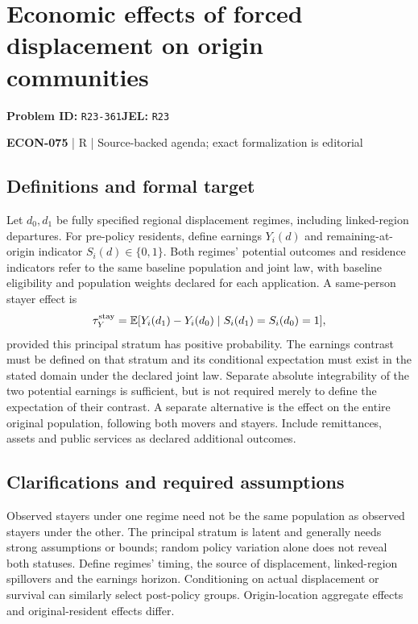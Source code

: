 \documentclass[11pt,a4paper]{article}
\begin{document}
\section*{Economic effects of forced displacement on origin communities}
\textbf{Problem ID:} \texttt{R23-361}\quad \textbf{JEL:} \texttt{R23}\par
\label{problem:OP-0641}


\label{audited:ECON-075}

{\sffamily\small\color{muted}\textbf{ECON-075} | R | Source-backed agenda; exact formalization is editorial\par}

\subsection*{Definitions and formal target}

Let \(d_0,d_1\) be fully specified regional displacement regimes, including linked-region departures. For pre-policy residents, define earnings \(Y_i(d)\) and remaining-at-origin indicator \(S_i(d)\in\{0,1\}\). Both regimes' potential outcomes and residence indicators refer to the same baseline population and joint law, with baseline eligibility and population weights declared for each application. A same-person stayer effect is
\[
 \tau_Y^{\rm stay}
 =\mathbb E[Y_i(d_1)-Y_i(d_0)\mid S_i(d_1)=S_i(d_0)=1],
\]
provided this principal stratum has positive probability. The earnings contrast must be defined on that stratum and its conditional expectation must exist in the stated domain under the declared joint law. Separate absolute integrability of the two potential earnings is sufficient, but is not required merely to define the expectation of their contrast. A separate alternative is the effect on the entire original population, following both movers and stayers. Include remittances, assets and public services as declared additional outcomes.

\subsection*{Clarifications and required assumptions}

Observed stayers under one regime need not be the same population as observed stayers under the other. The principal stratum is latent and generally needs strong assumptions or bounds; random policy variation alone does not reveal both statuses. Define regimes' timing, the source of displacement, linked-region spillovers and the earnings horizon. Conditioning on actual displacement or survival can similarly select post-policy groups. Origin-location aggregate effects and original-resident effects differ.
\end{document}
